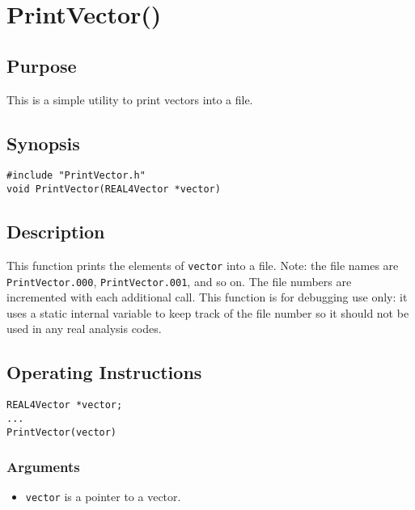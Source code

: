 \documentclass{article}
\begin{document}
\section{PrintVector()}

\subsection{Purpose}

This is a simple utility to print vectors into a file.
 
\subsection{Synopsis}


\begin{verbatim}
#include "PrintVector.h"
void PrintVector(REAL4Vector *vector)
\end{verbatim}


\subsection{Description}

This function prints the elements of {\tt vector} into a file.
Note: the file names are {\tt PrintVector.000}, {\tt PrintVector.001},
and so on.  The file numbers are incremented with each additional call.
This function is for debugging use only: it uses a static internal
variable to keep track of the file number so it should not
be used in any real analysis codes.


\subsection{Operating Instructions}


\begin{verbatim}
REAL4Vector *vector;
... 
PrintVector(vector)
\end{verbatim}


\subsubsection{Arguments}


\begin{itemize}
\item {\tt vector\/} is a pointer to a vector.
\end{itemize}
\end{document}
